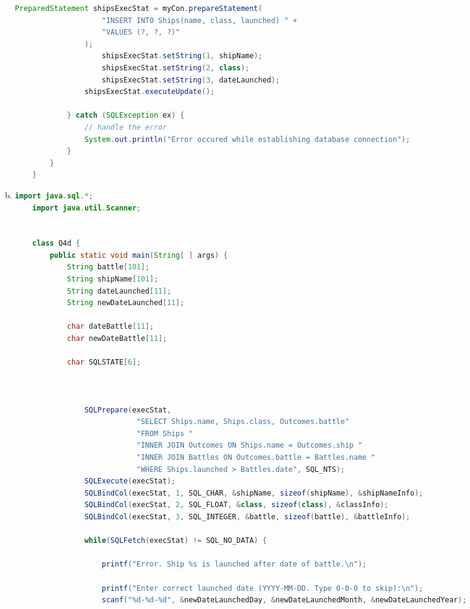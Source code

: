 \documentclass[12pt]{article}
\begin{document}
\begin{enumerate}[1.]
\begin{enumerate}[a)]
\begin{lstlisting}[language=JAVA]
                PreparedStatement shipsExecStat = myCon.prepareStatement(
                    "INSERT INTO Ships(name, class, launched) " +
                    "VALUES (?, ?, ?)"
                );
                    shipsExecStat.setString(1, shipName);
                    shipsExecStat.setString(2, class);
                    shipsExecStat.setString(3, dateLaunched);
                shipsExecStat.executeUpdate();

            } catch (SQLException ex) {
                // handle the error
                System.out.println("Error occured while establishing database connection");
            }
        }
    }
    \end{lstlisting}

        \item

    \begin{lstlisting}[language=JAVA]
    import java.sql.*;
    import java.util.Scanner;


    class Q4d {
        public static void main(String[ ] args) {
            String battle[101];
            String shipName[101];
            String dateLaunched[11];
            String newDateLaunched[11];

            char dateBattle[11];
            char newDateBattle[11];

            char SQLSTATE[6];



                SQLPrepare(execStat,
                            "SELECT Ships.name, Ships.class, Outcomes.battle"
                            "FROM Ships "
                            "INNER JOIN Outcomes ON Ships.name = Outcomes.ship "
                            "INNER JOIN Battles ON Outcomes.battle = Battles.name "
                            "WHERE Ships.launched > Battles.date", SQL_NTS);
                SQLExecute(execStat);
                SQLBindCol(execStat, 1, SQL_CHAR, &shipName, sizeof(shipName), &shipNameInfo);
                SQLBindCol(execStat, 2, SQL_FLOAT, &class, sizeof(class), &classInfo);
                SQLBindCol(execStat, 3, SQL_INTEGER, &battle, sizeof(battle), &battleInfo);

                while(SQLFetch(execStat) != SQL_NO_DATA) {

                    printf("Error. Ship %s is launched after date of battle.\n");

                    printf("Enter correct launched date (YYYY-MM-DD. Type 0-0-0 to skip):\n");
                    scanf("%d-%d-%d", &newDateLaunchedDay, &newDateLaunchedMonth, &newDateLaunchedYear);


\end{lstlisting}
\end{enumerate}
\end{enumerate}
\end{document}
